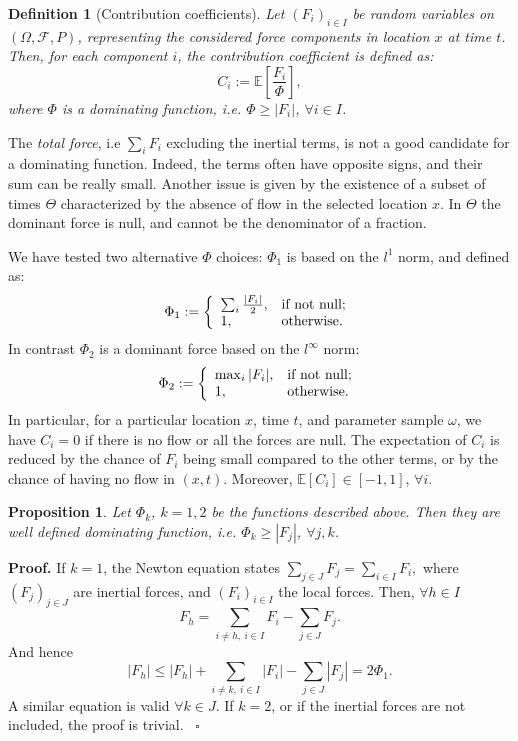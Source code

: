 \documentclass{article}
\newtheorem{definition}[theorem]{Definition}
\newtheorem{proposition}[theorem]{Proposition}
\newenvironment{proof}[1][Proof]{\noindent\textbf{#1.} }{\ $\square$}
\begin{document}
\begin{definition}[Contribution coefficients]
Let $(F_i)_{i\in I}$ be random variables on $(\Omega, \mathcal F, P)$, representing the considered force components in location $x$ at time $t$. Then, for each component $i$, the contribution coefficient is defined as:
$$C_i:=\mathbb E\left[\frac{F_i}{\Phi}\right],$$
where $\Phi$ is a dominating function, i.e. $\Phi\ge |F_i|$, $\forall i\in I$.
\end{definition}
The \emph{total force}, i.e $\sum_i F_i$ excluding the inertial terms, is not a good candidate for a dominating function. Indeed, the terms often have opposite signs, and their sum can be really small. Another issue is given by the existence of a subset of times $\Theta$ characterized by the absence of flow in the selected location $x$. In $\Theta$ the dominant force is null, and cannot be the denominator of a fraction.

We have tested two alternative $\Phi$ choices: $\Phi_1$ is based on the $l^1$ norm, and defined as:
$$\Phi_1:=\left\{
    \begin{array}{ll}
      \sum_i \frac{|F_i|}{2}, & \hbox{if not null;} \\
      1, & \hbox{otherwise.}
    \end{array}
  \right.$$
In contrast $\Phi_2$ is a dominant force based on the $l^\infty$ norm:
$$\Phi_2:=\left\{
    \begin{array}{ll}
      \max_i |F_i|, & \hbox{if not null;} \\
      1, & \hbox{otherwise.}
    \end{array}
  \right.$$
In particular, for a particular location $x$, time $t$, and parameter sample $\omega$, we have $C_i=0$ if there is no flow or all the forces are null. The expectation of $C_i$ is reduced by the chance of $F_i$ being small compared to the other terms, or by the chance of having no flow in $(x,t)$. Moreover, $\mathbb E[C_i]\in[-1,1]$, $\forall i$.
\begin{proposition}
Let $\Phi_k$, $k=1,2$ be the functions described above. Then they are well defined dominating function, i.e. $\Phi_k\ge |F_j|$, $\forall j,k$.
\end{proposition}
\begin{proof}
If $k=1$, the Newton equation states $\sum_{j\in J} F_j =\sum_{i\in I} F_i,$ where $(F_j)_{j\in J}$ are inertial forces, and $(F_i)_{i\in I}$ the local forces. Then, $\forall h\in I$
$$F_h=\sum_{i\neq h,\ i\in I} F_i - \sum_{j\in J} F_j.$$
And hence
$$|F_h|\le |F_h|+\sum_{i\neq k,\ i\in I} |F_i| - \sum_{j\in J} |F_j|=2\Phi_1.$$
A similar equation is valid $\forall k\in J$. If $k=2$, or if the inertial forces are not included, the proof is trivial.
\end{proof}
\end{document}
